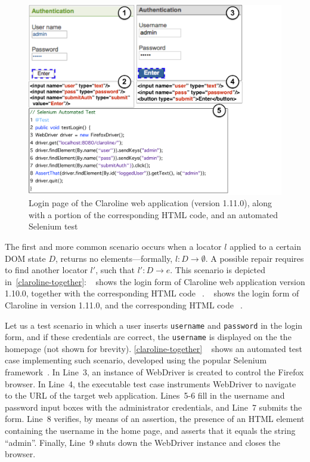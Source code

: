 \begin{figure}[t]
\centering
\includegraphics[trim={0cm 0cm 5.5cm 0cm},clip,scale=0.275]{images/claroline-together}
\caption{Login page of the Claroline web application (version 1.11.0), along with a portion of the corresponding HTML code, and an automated Selenium test}
\label{claroline-together}
\end{figure}

The first and more common scenario occurs when a locator $l$ applied to a certain DOM state $D$, returns no elements---formally, $l: D \rightarrow \emptyset$. A possible repair requires to find another locator $l'$, such that $l': D \rightarrow e$.
This scenario is depicted in~\autoref{claroline-together}:~\textcircled{} shows the login form of Claroline web application version 1.10.0, together with the corresponding HTML code~\textcircled{}.~\textcircled{} shows the login form of Claroline in version 1.11.0, and the corresponding HTML code~\textcircled{}. 

Let us a test scenario in which a user 
inserts \texttt{username} and \texttt{password} 
in the login form, and if these credentials are correct, 
the \texttt{username} is displayed on the the homepage (not shown for brevity).
\autoref{claroline-together}~\textcircled{} shows an automated test case implementing such scenario, developed using the popular Selenium framework~\cite{selenium}.
In Line~3, an instance of WebDriver is created to control the Firefox browser. 
In Line~4, the executable test case instruments WebDriver to 
navigate to the URL of the target web application.  
Lines~5-6 fill in the username and password input boxes 
with the administrator credentials, and Line~7 submits the form. 
Line~8 verifies, by means of an assertion, the presence 
of an HTML element containing the username in the home page, 
and asserts that it equals the string ``admin''. 
Finally, Line~9 shuts down the WebDriver instance 
and closes the browser.

